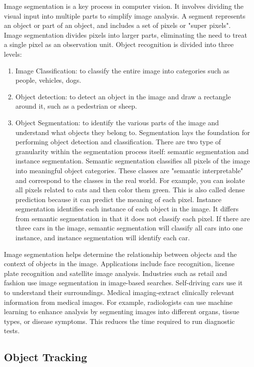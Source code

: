Image segmentation is a key process in computer vision. It involves dividing the visual input into multiple parts to simplify image analysis. A segment represents an object or part of an object, and includes a set of pixels or "super pixels". Image segmentation divides pixels into larger parts, eliminating the need to treat a single pixel as an observation unit. Object recognition is divided into three levels:
\begin{enumerate}
	\item Image Classification: to classify the entire image into categories such as people, vehicles, dogs.
	\item Object detection: to detect an object in the image and draw a rectangle around it, such as a pedestrian or sheep.
	\item Object Segmentation: to identify the various parts of the image and understand what objects they belong to. Segmentation lays the foundation for performing object detection and classification. There are two type of granularity within the segmentation process itself: semantic segmentation and instance segmentation. Semantic segmentation classifies all pixels of the image into meaningful object categories. These classes are "semantic interpretable" and correspond to the classes in the real world. For example, you can isolate all pixels related to cats and then color them green. This is also called dense prediction because it can predict the meaning of each pixel. Instance segmentation identifies each instance of each object in the image. It differs from semantic segmentation in that it does not classify each pixel. If there are three cars in the image, semantic segmentation will classify all cars into one instance, and instance segmentation will identify each car.
\end{enumerate}
Image segmentation helps determine the relationship between objects and the context of objects in the image. Applications include face recognition, license plate recognition and satellite image analysis. Industries such as retail and fashion use image segmentation in image-based searches. Self-driving cars use it to understand their surroundings. Medical imaging-extract clinically relevant information from medical images. For example, radiologists can use machine learning to enhance analysis by segmenting images into different organs, tissue types, or disease symptoms. This reduces the time required to run diagnostic tests.
\subsection{Object Tracking}

